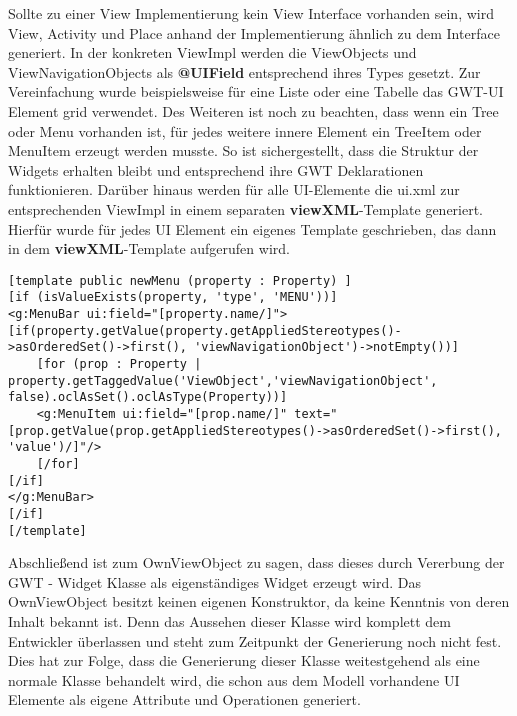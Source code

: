 Sollte zu einer View Implementierung kein View Interface vorhanden sein, wird View, Activity und Place anhand der Implementierung ähnlich zu dem Interface generiert.
In der konkreten ViewImpl werden die ViewObjects und ViewNavigationObjects als \textbf{@UIField} entsprechend ihres Types gesetzt. Zur Vereinfachung wurde beispielsweise für eine Liste oder eine Tabelle das GWT-UI Element grid verwendet. Des Weiteren ist noch zu beachten, dass wenn ein Tree oder Menu vorhanden ist, für jedes weitere innere Element ein TreeItem oder MenuItem erzeugt werden musste. So ist sichergestellt, dass die Struktur der Widgets erhalten bleibt und entsprechend ihre GWT Deklarationen funktionieren.
Darüber hinaus werden für alle UI-Elemente die ui.xml zur entsprechenden ViewImpl in einem separaten \textbf{viewXML}-Template generiert. Hierfür wurde für jedes UI Element ein eigenes Template geschrieben, das dann in dem \textbf{viewXML}-Template aufgerufen wird. 
\lstset{language=OCL}
\begin{lstlisting}[caption={Template für die XML - Generierung eines Menus}]
[template public newMenu (property : Property) ]
[if (isValueExists(property, 'type', 'MENU'))]
<g:MenuBar ui:field="[property.name/]">
[if(property.getValue(property.getAppliedStereotypes()->asOrderedSet()->first(), 'viewNavigationObject')->notEmpty())]
	[for (prop : Property | property.getTaggedValue('ViewObject','viewNavigationObject', false).oclAsSet().oclAsType(Property))]
	<g:MenuItem ui:field="[prop.name/]" text="[prop.getValue(prop.getAppliedStereotypes()->asOrderedSet()->first(), 'value')/]"/>
	[/for]
[/if]
</g:MenuBar>
[/if]
[/template]
\end{lstlisting}
Abschließend ist zum OwnViewObject zu sagen, dass dieses durch Vererbung der GWT - Widget Klasse als eigenständiges Widget erzeugt wird. Das OwnViewObject besitzt keinen eigenen Konstruktor, da keine Kenntnis von deren Inhalt bekannt ist. Denn das Aussehen dieser Klasse wird komplett dem Entwickler überlassen und steht zum Zeitpunkt der Generierung noch nicht fest. Dies hat zur Folge, dass die Generierung dieser Klasse weitestgehend als eine normale Klasse behandelt wird, die schon aus dem Modell vorhandene UI Elemente als eigene Attribute und Operationen generiert. 
